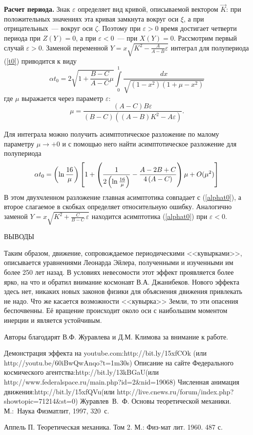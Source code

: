 \documentclass[14pt,a4paper]{extarticle}
\def\DS{\displaystyle}
\def\eps{\varepsilon}
\begin{document}
{\bf Расчет периода.} Знак $\varepsilon$ определяет вид кривой, описываемой вектором $\vec{K}$: при положительных значениях эта кривая замкнута вокруг оси $\xi$, а при отрицательных~--- вокруг оси $\zeta$. Поэтому при $\varepsilon>0$ время достигает четверти периода при $Z(Y)=0$, а при $\varepsilon<0$~--- при $X(Y)=0$. Рассмотрим первый случай $\eps>0$. Заменой переменной
$
Y=x\sqrt{K^2-\frac{A}{A-B}\eps}
$
интеграл для полупериода (\ref{t0})  приводится к виду
$$
\DS \alpha t_0=2\sqrt{1+\frac{B-C}{A-C}\mu}\int\limits_0^1\frac{dx}{\sqrt{(1-x^2)(1+\mu-x^2)}}
$$
где $\mu$ выражается через параметр $\eps$:
$$\mu =\frac{\left( A-C\right) B\eps}{\left(
B-C\right) \left( \left( A-B\right) K^{2}-A\eps\right) }.$$

Для интеграла можно получить асимптотическое разложение по малому параметру $\mu\rightarrow +0$
и с помощью него найти асимптотическое разложение для полупериода
$$\alpha t_{0}=
\left( \ln \frac{16}{\mu }\right) \left[ 1+\left( \frac{1}{2\left( \ln \frac{%
16}{\mu }\right) }-\frac{A-2B+C}{4\left( A-C\right) }\right) \mu +O(\mu ^{2})%
\right] $$
В этом двухчленном разложение главная асимптотика совпадает с (\ref{alphat0}), а второе слагаемое в скобках определяет относительную ошибку.
Аналогично заменой $Y=x\sqrt{K^2+\frac{C}{B-C}\,\varepsilon}$ находится асимптотика (\ref{alphat0}) при $\eps<0$.


\bigskip

{ВЫВОДЫ}


\smallskip
Таким образом, движение, сопровождаемое периодическими <<кувырками>>, описывается уравнениями Леонарда Эйлера, полученными и изученными им более 250 лет назад. В условиях невесомости этот эффект проявляется более ярко, на что и обратил внимание космонавт В.А. Джанибеков. Нового эффекта здесь нет, никаких новых законов физики для объяснения движения привлекать не надо. Что же касается возможности <<кувырка>> Земли, то эти опасения беспочвенны. Её вращение происходит около оси с наибольшим моментом инерции и является устойчивым.


\smallskip

Авторы благодарят В.Ф. Журавлева и Д.М. Климова за внимание к работе.

\bigskip

\begin{thebibliography}{99}
 Демонстрация эффекта на youtube.com:\newline http://bit.ly/15xfCOk (или http://youtu.be/60iBwQwAnqo?t=1m30s)
 Описание на сайте Федерального космического агентства:\newline http://bit.ly/13kBGaU\newline (или http://www.federalspace.ru/main.php?id=2\&nid=19068)
 Численная анимация движения:\newline http://bit.ly/15xfQVu\newline (или http://live.cnews.ru/forum/index.php?showtopic=71214\&st=0)
 Журавлев~В.~Ф. Основы теоретической механики.
М.:~Наука Физматлит, 1997, 320~с.

 Аппель П. Теоретическая механика. Том 2. М.: Физ-мат лит. 1960. 487 с.
\end{thebibliography}
\end{document}
